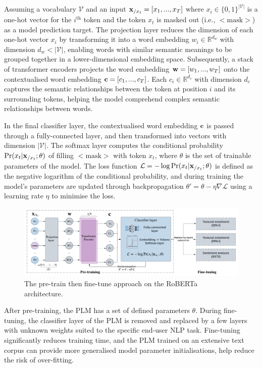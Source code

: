 Assuming a vocabulary $\mathcal{V}$ and an input $\bold{x}_{/x_t} = [x_1, ... , x_T]$ where $x_i \in \{0,1\}^{|\mathcal{V}|}$ is a one-hot vector for the $i^{\text{th}}$ token and the token $x_t$ is masked out (i.e., $<$$\text{mask}$$>$) as a model prediction target. The projection layer reduces the dimension of each one-hot vector $x_i$ by transforming it into a word embedding $w_i \in \mathbb{R}^{d_w}$ with dimension $d_w < |\mathcal{V}|$, enabling words with similar semantic meanings to be grouped together in a lower-dimensional embedding space. Subsequently, a stack of transformer encoders projects the word embedding $\bold{w} = [w_1, ..., w_T]$ onto the contextualised word embedding $\bold{c} = [c_1, ..., c_T]$. Each $c_i \in \mathbb{R}^{d_c}$ with dimension $d_c$ captures the semantic relationships between the token at position $i$ and its surrounding tokens, helping the model comprehend complex semantic relationships between words. 

In the final classifier layer, the contextualised word embedding $\bold{c}$ is passed through a fully-connected layer, and then transformed into vectors with dimension $|\mathcal{V}|$. The softmax layer computes the conditional probability $\Pr(x_t | \bold{x}_{/x_t}; \theta)$ of filling $<$$\text{mask}$$>$ with token $x_t$, where $\theta$ is the set of trainable parameters of the model. The loss function $\mathcal{L} = -\log \Pr(x_t|\bold{x}_{/x_t}; \theta)$ is defined as the negative logarithm of the conditional probability, and during training the model's parameters are updated through backpropagation $\theta' = \theta - \eta \nabla\mathcal{L}$ using a learning rate $\eta$ to minimise the loss.

\begin{figure}[!ht]
    \centering
    \includegraphics[width=\hsize]{figures/preparation_media/prepare-plm.pdf}
    \caption{The pre-train then fine-tune approach on the RoBERTa architecture.}
    \label{fig:prepare-plm}
\end{figure}
\vspace{-0.3em}

After pre-training, the PLM has a set of defined parameters $\theta$. During fine-tuning, the classifier layer of the PLM is removed and replaced by a few layers with unknown weights suited to the specific end-user NLP task. Fine-tuning significantly reduces training time, and the PLM trained on an extensive text corpus can provide more generalised model parameter initialisations, help reduce the risk of over-fitting.

